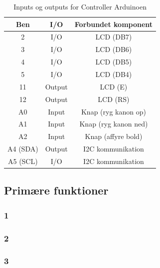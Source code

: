 \begin{table}[H]
	\caption{Inputs og outputs for Controller Arduinoen} %
	\label{tab:IOController}
	\centering
		\begin{tabular}{c|c c} 
		Ben & I/O & Forbundet komponent\\ [0.5ex] 
		\hline 
			2 & I/O & LCD (DB7)\\
			3 & I/O & LCD (DB6)\\
			4 &I/O & LCD (DB5)\\
			5 &I/O & LCD (DB4)\\
			11 & Output & LCD (E)\\
			12 &Output & LCD (RS)\\
			A0 & Input & Knap (ryg kanon op)\\
			A1 & Input & Knap (ryg kanon ned)\\			
			A2 & Input & Knap (affyre bold)\\
			A4 (SDA) & Output & I2C kommunikation\\
			A5 (SCL) & I/O & I2C kommunikation\\[1ex]
		\hline %
	\end{tabular}
\end{table}
\subsection{Primære funktioner}\label{sec:primaerefunc}
\subsubsection{1}
\subsubsection{2}
\subsubsection{3}